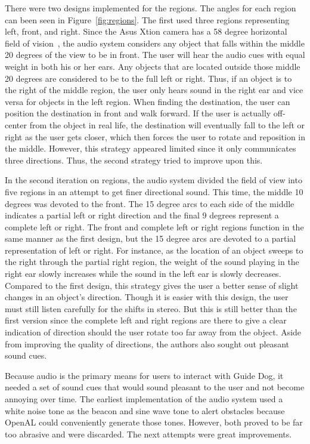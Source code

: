 There were two designs implemented for the regions. The angles for each region 
can been seen in Figure~\ref{fig:regions}. The first used three regions 
representing left, front, and right. Since the Asus Xtion camera has a 58 degree 
horizontal field of vision~\cite{xtion-website}, the audio system considers any 
object that falls within the middle 20 degrees of the view to be in front. The 
user will hear the audio cues with equal weight in both his or her ears. Any 
objects that are located outside those middle 20 degrees are considered to be to 
the full left or right. Thus, if an object is to the right of the middle region, 
the user only hears sound in the right ear and vice versa for objects in the 
left region. When finding the destination, the user can position the destination 
in front and walk forward. If the user is actually off-center from the object in 
real life, the destination will eventually fall to the left or right as the user 
gets closer, which then forces the user to rotate and reposition in the 
middle. However, this strategy appeared limited since it only communicates 
three directions. Thus, the second strategy tried to improve upon this.

In the second iteration on regions, the audio system divided the field of view
into five regions in an attempt to get finer directional sound. This time, the
middle 10 degrees was devoted to the front. The 15 degree arcs to each side of
the middle indicates a partial left or right direction and the final 9 degrees 
represent a complete left or right. The front and complete left or right regions 
function in the same manner as the first design, but the 15 degree arcs are 
devoted to a partial representation of left or right. For instance, as the
location of an object sweeps to the right through the partial right region, the 
weight of the sound playing in the right ear slowly increases while the sound in
the left ear is slowly decreases. Compared to the first design, this strategy 
gives the user a better sense of slight changes in an object's direction. Though
it is easier with this design, the user must still listen carefully for the
shifts in stereo. But this is still better than the first version since the
complete left and right regions are there to give a clear indication of direction
should the user rotate too far away from the object. Aside from improving the
quality of directions, the authors also sought out pleasant sound cues.

Because audio is the primary means for users to interact with Guide Dog, it
needed a set of sound cues that would sound pleasant to the user and not become
annoying over time. The earliest implementation of the audio system used a
white noise tone as the beacon and sine wave tone to alert obstacles because
OpenAL could conveniently generate those tones. However, both proved to be far 
too abrasive and were discarded. The next attempts were great improvements.

